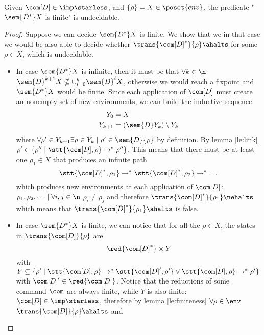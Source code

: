 \begin{lemma}\label{le:infiniteness}
  Given \(\com[D]\in\imp\starless\), and \(\{\rho\} = X \in
  \poset{env}\), the predicate "\(\sem{D^*}X\) is finite" is
  undecidable.
\end{lemma}

\begin{proof}
  Suppose we can decide \(\sem{D^*}X\) is finite. We show that we in
  that case we would be also able to decide whether
  \(\trans{\com[D]^*}{\rho}\ahalts\) for some \(\rho \in X\), which is
  undecidable.%
  \begin{itemize}
  \item In case \(\sem{D^*}X\) is infinite, then it must be that
    \(\forall k \in \n\)
    \(\sem{D}^{k+1}X \nsubseteq \cup_{i=0}^k\sem{D}^iX\), otherwise we
    would reach a fixpoint and \(\sem{D^*}X\) would be finite. Since
    each application of \(\com[D]\) must create an nonempty set of new
    environments, we can build the inductive sequence
    \begin{align*}
      Y_0 & = X \\
      Y_{k+1} & = (\sem{D}Y_k)\setminus Y_k
    \end{align*}
    where \(\forall \rho' \in Y_{k+1} \exists \rho \in Y_k \mid \rho'
    \in \sem{D}\{\rho\}\) by definition. By lemma \ref{le:link}
    \(\rho' \in \{\rho'' \mid \stt{\com[D], \rho} \to^*
    \rho''\}\). This means that there must be at least one \(\rho_1\in
    X\) that produces an infinite path \[\stt{\com[D]^*,
      \rho_1}\to^*\stt{\com[D]^*, \rho_2}\to^*\dots \] which produces
    new environments at each application of \(\com[D]\): \(\rho_1,
    \rho_2, \dots \mid \forall i,j \in \n\) \(\rho_i \neq \rho_j\) and
    therefore \(\trans{\com[D]^*}{\rho_1} \nehalts\) which means that
    \(\trans{\com[D]^*}{\rho_1}\ahalts\) is false.
  \item In case \(\sem{D^*}X\) is finite, we can notice that for all
    the \(\rho \in X\), the states in \(\trans{\com[D]}{\rho}\)
    are \[\red{\com[D]^*}\times Y\] with
    \(Y \subseteq \{\rho'\mid \stt{\com[D], \rho} \to^* \stt{\com[D]',
      \rho'} \vee \stt{\com[D],\rho} \to^* \rho'\}\) with
    \(\com[D]'\in \red{\com[D]}\). Notice that the reductions of some
    command \(\com\) are always finite, while \(Y\) is also finite:
    \(\com[D] \in \imp\starless\), therefore by lemma
    \ref{le:finiteness} \(\forall \rho \in \env\)
    \(\trans{\com[D]}{\rho} \ahalts\) and

\end{itemize}
\end{proof}
